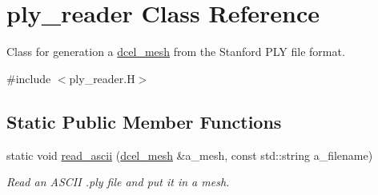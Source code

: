 \hypertarget{classply__reader}{}\section{ply\+\_\+reader Class Reference}
\label{classply__reader}


Class for generation a \hyperlink{classdcel__mesh}{dcel\+\_\+mesh} from the Stanford P\+LY file format.  




{\ttfamily \#include $<$ply\+\_\+reader.\+H$>$}

\subsection*{Static Public Member Functions}
\begin{DoxyCompactItemize}
\item 
static void \hyperlink{classply__reader_a16116d5ea8da15cccbe769848e7a5da7}{read\+\_\+ascii} (\hyperlink{classdcel__mesh}{dcel\+\_\+mesh} \&a\+\_\+mesh, const std\+::string a\+\_\+filename)
\begin{DoxyCompactList}\small\item\em Read an A\+S\+C\+II .ply file and put it in a mesh. \end{DoxyCompactList}\end{DoxyCompactItemize}
